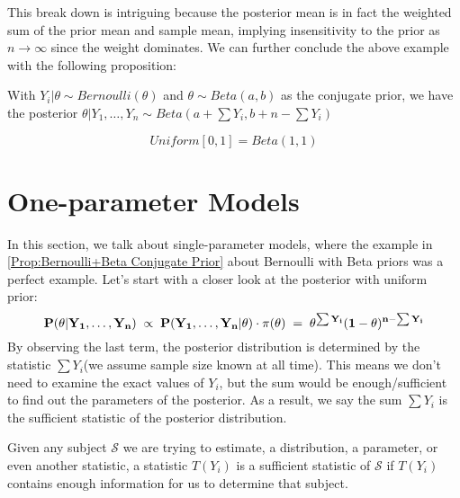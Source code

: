 This break down is intriguing because the posterior mean is in fact the weighted sum of the prior mean and sample mean, implying insensitivity to the prior as $n\rightarrow \infty$ since the weight dominates. We can further conclude the above example with the following proposition:

\begin{proposition}\label{Prop:Bernoulli+Beta Conjugate Prior}
    With $Y_i|\theta \sim Bernoulli(\theta)$ and $\theta \sim Beta(a,b)$ as the conjugate prior, we have the posterior $\theta | Y_1, \ldots, Y_n \sim Beta(a + \sum Y_i, b + n - \sum Y_i)$
\end{proposition}

\begin{remark}
    \begin{equation*}
        Uniform[0,1] = Beta(1,1)
    \end{equation*}
\end{remark}

\section{One-parameter Models}

In this section, we talk about single-parameter models, where the example in \autoref{Prop:Bernoulli+Beta Conjugate Prior} about Bernoulli with Beta priors was a perfect example. Let's start with a closer look at the posterior with uniform prior:
\begin{equation*}
    \bf{P}(\theta | Y_1, \ldots, Y_n) 
    \;\propto\; \bf{P}(Y_1, \ldots, Y_n | \theta) \cdot \pi(\theta) 
    \; = \; \theta^{\sum Y_i}(1-\theta)^{n - \sum Y_i}
\end{equation*}
By observing the last term, the posterior distribution is determined by the statistic $\sum Y_i$(we assume sample size known at all time). This means we don't need to examine the exact values of $Y_i$, but the sum would be enough/sufficient to find out the parameters of the posterior. As a result, we say the sum $\sum Y_i$ is the sufficient statistic of the posterior distribution.

\begin{definition}
    Given any subject $\mathcal{S}$ we are trying to estimate, a distribution, a parameter, or even another statistic, a statistic $T(Y_i)$ is a sufficient statistic of $\mathcal{S}$ if $T(Y_i)$ contains enough information for us to determine that subject.
\end{definition}

